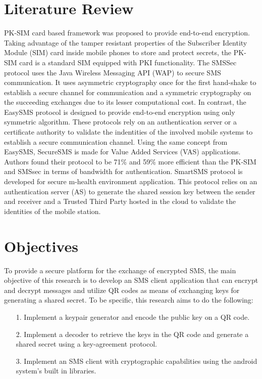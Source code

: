 \documentclass[journal]{./IEEE/IEEEtran}
\begin{document}
\section{Literature Review}
PK-SIM \cite{PKSIMcard07} card based framework  was proposed to 
provide end-to-end encryption. 
Taking advantage of the tamper resistant properties of the Subscriber Identity Module (SIM) card inside  mobile phones to store and protect secrets, the PK-SIM card is a standard SIM equipped with PKI functionality.
The SMSSec \cite{SMSSec08} protocol uses the Java Wireless Messaging API (WAP) to secure SMS communication.
It uses asymmetric cryptography once for the first hand-shake to establish a secure channel for communication and a symmetric cryptography on the succeeding exchanges due to its lesser computational cost. In contrast, the EasySMS \cite{EasySMS14} protocol is designed to provide end-to-end encryption using only symmetric algorithm. 
These protocols rely on an authentication server or a certificate authority to validate the indentities of the involved mobile systems to establish a secure communication channel. 
Using the same concept from EasySMS, SecureSMS \cite{SecureSMS14} is made for Value Added Services (VAS) applications. Authors found their protocol to be 71\% and 59\% more efficient than the PK-SIM and SMSsec in terms of bandwidth for authentication. 
SmartSMS \cite{SmartSMS16} protocol is developed for secure m-health environment application. This protocol relies on an authentication server (AS) to generate the shared session key between the sender and receiver and a Trusted Third Party hosted in the cloud to validate the identities of the mobile station.  

\section{Objectives}
To provide a secure platform for the exchange of encrypted SMS, the main
objective of this research is to develop an SMS client application that
can encrypt and decrypt messages and utilize QR codes as means of
exchanging keys for generating a shared secret. To be specific, this research
aims to do the following:
\begin{itemize}
    \item[1.] Implement a keypair generator and encode the public key on a
        QR code.
    \item[2.] Implement a decoder to retrieve the keys in the QR code and
        generate a shared secret using a key-agreement protocol.
    \item[3.] Implement an SMS client with cryptographic capabilities
        using the android system's built in libraries.
\end{itemize}
\end{document}
